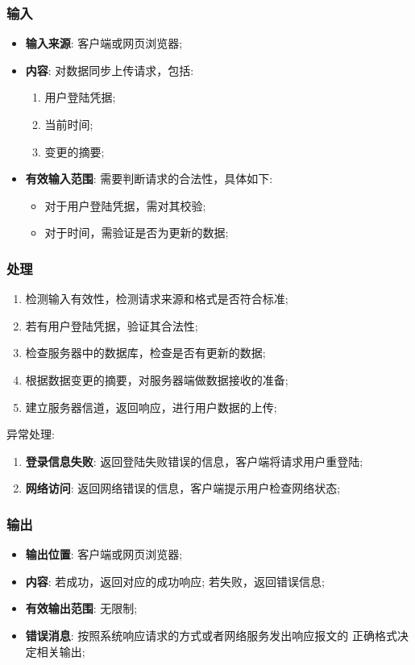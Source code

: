 \subsubsection{输入}
	\begin{itemize}
		\item \textbf{输入来源}: 客户端或网页浏览器;
		\item \textbf{内容}: 对数据同步上传请求，包括: 
		\begin{enumerate}
			\item 用户登陆凭据;
			\item 当前时间;
			\item 变更的摘要;
		\end{enumerate}
		\item \textbf{有效输入范围}: 需要判断请求的合法性，具体如下: 
		\begin{itemize}
			\item 对于用户登陆凭据，需对其校验; 
			\item 对于时间，需验证是否为更新的数据; 
		\end{itemize}
	\end{itemize}
\subsubsection{处理}
	\begin{enumerate}
		\item 检测输入有效性，检测请求来源和格式是否符合标准;
		\item 若有用户登陆凭据，验证其合法性;
		\item 检查服务器中的数据库，检查是否有更新的数据;
		\item 根据数据变更的摘要，对服务器端做数据接收的准备;
		\item 建立服务器信道，返回响应，进行用户数据的上传;
	\end{enumerate}
	\noindent 异常处理: 
	\begin{enumerate}
		\item \textbf{登录信息失败}: 返回登陆失败错误的信息，客户端将请求用户重登陆;
		\item \textbf{网络访问}: 返回网络错误的信息，客户端提示用户检查网络状态;
	\end{enumerate}
\subsubsection{输出}
\begin{itemize}
	\item \textbf{输出位置}: 客户端或网页浏览器;
	\item \textbf{内容}: 若成功，返回对应的成功响应; 若失败，返回错误信息;
	\item \textbf{有效输出范围}: 无限制;
	\item \textbf{错误消息}: 按照系统响应请求的方式或者网络服务发出响应报文的
		正确格式决定相关输出;
\end{itemize}

